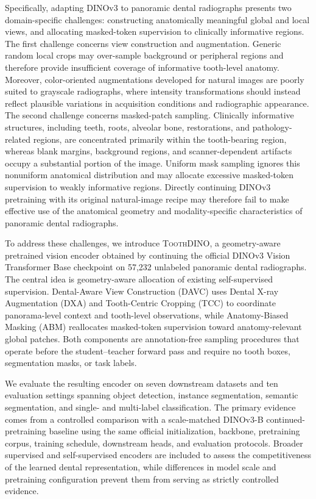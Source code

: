 \documentclass[conference]{IEEEtran}
\newcommand{\ToothDINO}{\textsc{ToothDINO}}
\newcommand{\DAVC}{\textsc{DAVC}}
\newcommand{\DXA}{\textsc{DXA}}
\newcommand{\TCC}{\textsc{TCC}}
\newcommand{\ABM}{\textsc{ABM}}
\begin{document}
Specifically, adapting DINOv3 to panoramic dental radiographs presents two domain-specific challenges: constructing anatomically meaningful global and local views, and allocating masked-token supervision to clinically informative regions. The first challenge concerns view construction and augmentation. Generic random local crops may over-sample background or peripheral regions and therefore provide insufficient coverage of informative tooth-level anatomy. Moreover, color-oriented augmentations developed for natural images are poorly suited to grayscale radiographs, where intensity transformations should instead reflect plausible variations in acquisition conditions and radiographic appearance. The second challenge concerns masked-patch sampling. Clinically informative structures, including teeth, roots, alveolar bone, restorations, and pathology-related regions, are concentrated primarily within the tooth-bearing region, whereas blank margins, background regions, and scanner-dependent artifacts occupy a substantial portion of the image. Uniform mask sampling ignores this nonuniform anatomical distribution and may allocate excessive masked-token supervision to weakly informative regions. Directly continuing DINOv3 pretraining with its original natural-image recipe may therefore fail to make effective use of the anatomical geometry and modality-specific characteristics of panoramic dental radiographs.

To address these challenges, we introduce \ToothDINO{}, a geometry-aware pretrained vision encoder obtained by continuing the official DINOv3 Vision Transformer Base checkpoint on 57,232 unlabeled panoramic dental radiographs. The central idea is geometry-aware allocation of existing self-supervised supervision. Dental-Aware View Construction (\DAVC{}) uses Dental X-ray Augmentation (\DXA{}) and Tooth-Centric Cropping (\TCC{}) to coordinate panorama-level context and tooth-level observations, while Anatomy-Biased Masking (\ABM{}) reallocates masked-token supervision toward anatomy-relevant global patches. Both components are annotation-free sampling procedures that operate before the student--teacher forward pass and require no tooth boxes, segmentation masks, or task labels.

We evaluate the resulting encoder on seven downstream datasets and ten evaluation settings spanning object detection, instance segmentation, semantic segmentation, and single- and multi-label classification. The primary evidence comes from a controlled comparison with a scale-matched DINOv3-B continued-pretraining baseline using the same official initialization, backbone, pretraining corpus, training schedule, downstream heads, and evaluation protocols. Broader supervised and self-supervised encoders are included to assess the competitiveness of the learned dental representation, while differences in model scale and pretraining configuration prevent them from serving as strictly controlled evidence.
\end{document}
